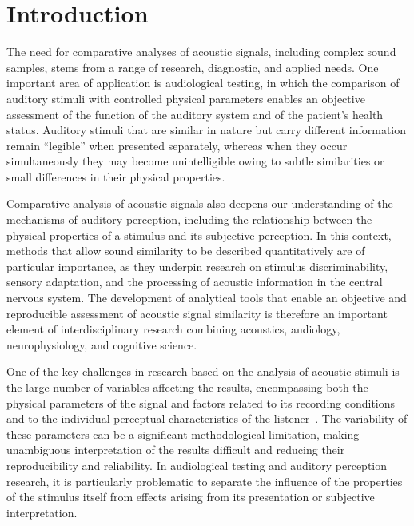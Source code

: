 \documentclass[doubleblind,preprint,12pt]{elsarticle}
\begin{document}
\linenumbers

\section{Introduction}

The need for comparative analyses of acoustic signals, including complex sound samples, stems from a range of research, diagnostic, and applied needs. One important area of application is audiological testing, in which the comparison of auditory stimuli with controlled physical parameters enables an objective assessment of the function of the auditory system and of the patient's health status.
Auditory stimuli that are similar in nature but carry different information remain ``legible'' when presented separately, whereas when they occur simultaneously they may become unintelligible owing to subtle similarities or small differences in their physical properties.

Comparative analysis of acoustic signals also deepens our understanding of the mechanisms of auditory perception, including the relationship between the physical properties of a stimulus and its subjective perception. In this context, methods that allow sound similarity to be described quantitatively are of particular importance, as they underpin research on stimulus discriminability, sensory adaptation, and the processing of acoustic information in the central nervous system.
The development of analytical tools that enable an objective and reproducible assessment of acoustic signal similarity is therefore an important element of interdisciplinary research combining acoustics, audiology, neurophysiology, and cognitive science.

One of the key challenges in research based on the analysis of acoustic stimuli is the large number of variables affecting the results, encompassing both the physical parameters of the signal and factors related to its recording conditions and to the individual perceptual characteristics of the listener~\cite{Letowski1989SoundQuality}. The variability of these parameters can be a significant methodological limitation, making unambiguous interpretation of the results difficult and reducing their reproducibility and reliability. In audiological testing and auditory perception research, it is particularly problematic to separate the influence of the properties of the stimulus itself from effects arising from its presentation or subjective interpretation.
\end{document}

